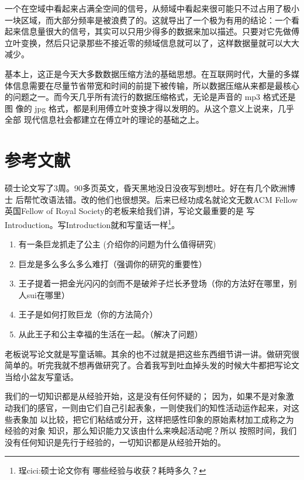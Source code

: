 一个在空域中看起来占满全空间的信号，从频域中看起来很可能只不过占用了极小
一块区域，而大部分频率是被浪费了的。这就导出了一个极为有用的结论：一个看
起来信息量很大的信号，其实可以只用少得多的数据来加以描述。只要对它先做傅
立叶变换，然后只记录那些不接近零的频域信息就可以了，这样数据量就可以大大
减少。

基本上，这正是今天大多数数据压缩方法的基础思想。在互联网时代，大量的多媒
体信息需要在尽量节省带宽和时间的前提下被传输，所以数据压缩从来都是最核心
的问题之一。而今天几乎所有流行的数据压缩格式，无论是声音的 mp3 格式还是图
像的 jpg 格式，都是利用傅立叶变换才得以发明的。从这个意义上说来，几乎全部
现代信息社会都建立在傅立叶的理论的基础之上。



\section{参考文献}


硕士论文写了3周。90多页英文，昏天黑地没日没夜写到想吐。好在有几个欧洲博士
后帮忙改语法错。改的他们也很想哭。后来已经功成名就论文无数ACM
Fellow英国Fellow of Royal Society的老板来给我们讲，写论文最重要的是
写Introduction。写Introduction就和写童话一样\footnote{珵cici:硕士论文你有
  哪些经验与收获？耗時多久？}。

\begin{enumerate}[1.]
\item 有一条巨龙抓走了公主 (介绍你的问题为什么值得研究)
\item 巨龙是多么多么多么难打（强调你的研究的重要性）
\item 王子提着一把金光闪闪的剑而不是破斧子烂长矛登场（你的方法好在哪里，别人sui在哪里）
\item 王子是如何打败巨龙（你的方法简介）
\item 从此王子和公主幸福的生活在一起。（解决了问题）
\end{enumerate}

老板说写论文就是写童话嘛。其余的也不过就是把这些东西细节讲一讲。做研究很
简单的。听完我就不想再做研究了。合着我写到吐血掉头发的时候大牛都把写论文
当给小盆友写童话。


我们的一切知识都是从经验开始\cite{李秋零1999}，这是没有任何怀疑的\cite{邓晓芒2005}\cite{邓晓芒2000}；
因为，如果不是对象激动我们的感官，一则由它们自己引起表象，一则使我们的知性活动运作起来，对这些表象加
以比较，把它们粘结或分开，\cite{欧进萍1999,欧进萍1991}这样把感性印象的原始素材加工成称之为经验的对象
知识，那么知识能力又该由什么来唤起活动呢？\cite{braun2007,kelton2002,strawderman2001,李秋零1999}所以
按照时间，我们没有任何知识是先行于经验的，一切知识都是从经验开始的。

